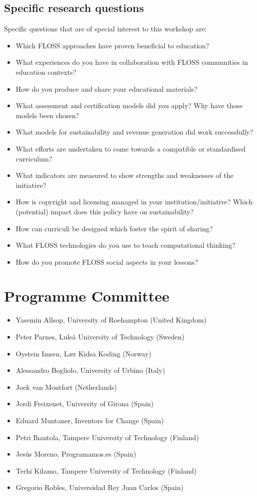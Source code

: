 \documentclass[ifip]{svmult}
\begin{document}
\subsection*{Specific research questions}
Specific questions that are of special interest to this workshop are: 
\begin{itemize}
 \item Which FLOSS approaches have proven beneficial to education?
 \item What experiences do you have in collaboration with FLOSS communities in education contexts?
 \item How do you produce and share your educational materials? 
 \item What assessment and certification models did you apply? Why have those models been chosen? 
 \item What models for sustainability and revenue generation did work successfully? 
 \item What efforts are undertaken to come towards a compatible or standardised curriculum? 
 \item What indicators are measured to show strengths and weaknesses of the initiative? 
 \item How is copyright and licensing managed in your institution/initiative? Which (potential) impact does this policy have on sustainability? 
 \item How can curriculi be designed which foster the spirit of sharing? 
 \item What FLOSS technologies do you use to teach computational thinking?
 \item How do you promote FLOSS social aspects in your lessons?
\end{itemize}
\section*{Programme Committee}
\begin{itemize}
	\item Yasemin Allsop, University of Roehampton (United Kingdom)
	\item Peter Parnes, Luleå University of Technology (Sweden)
	\item Oystein Imsen, Lær Kidsa Koding (Norway)
	\item Alessandro Bogliolo, University of Urbino (Italy)
	\item Joek van Montfort (Netherlands)
	\item Jordi Freixenet, University of Girona (Spain)
	\item Eduard Muntaner, Inventors for Change (Spain)
	\item Petri Ihantola, Tampere University of Technology (Finland)
	\item Jesús Moreno, Programamos.es (Spain)
	\item Terhi Kilamo, Tampere University of Technology (Finland)
	\item Gregorio Robles, Universidad Rey Juan Carlos (Spain)
\end{itemize}
\end{document}
